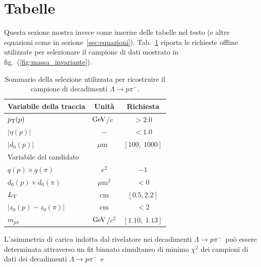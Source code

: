 \documentclass[a4paper,10pt]{article}
\newcommand{\proton}{\ensuremath{p}}
\newcommand{\lambdazero}{\ensuremath{\Lambda}}
\newcommand{\lambdazeroppi}{\ensuremath{\lambdazero \to \proton\pi^-}}
\newcommand{\pt}{\ensuremath{p_{\rm{T}}}}
\newcommand{\lxy}{\ensuremath{L_{\rm{T}}}}
\newcommand{\mum}{\mbox{$\mu$m}}				%
\newcommand{\gev}{\ensuremath{\mathrm{Ge\kern -0.1em V}}}	%
\newcommand{\massgev}{\mbox{\gev/$c^2$}}			%
\newcommand{\pgev}{\mbox{\gev/$c$}}				%
\begin{document}


\section{Tabelle}
\label{sec:tabelle}

Questa sezione mostra invece come inserire delle tabelle nel testo (e altre equazioni come in sezione~\ref{sec:equazioni}). 
Tab.~\ref{tab:selezione} riporta le richieste offline utilizzate per selezionare 
il campione di dati mostrato in fig.~(\ref{fig:massa_invariante}).
\begin{table}[!ht]
\centering
\begin{tabular}{lcc}
\hline\hline
Variabile della traccia		        &	Unit\`a		&	Richiesta		\\
\hline						                                                
$\pt(p)$ 						&	\pgev\		&	$>2.0$			\\
$|\eta(p)|$					&	$-$                  &	$<1.0$			\\
$|d_0(p)|$ 				        &    \mum\		&	$[100,~1000]$		\\
\hline
Variabile del candidato      		&         			&			           	\\
\hline
$q(p)\times q(\pi)$				&	$e^2$		&	$-1$			\\
$d_0(p) \times d_0(\pi)$			&	$\mum^2$	&	$< 0$			\\
\lxy\ 						&	 cm		        &	$[0.5,2.2]$		\\
$|z_{0}(p)-z_{0}(\pi)|$	 		&	 cm		        &	$<2$			\\
$m_{p\pi}$						&	\massgev	&	$[1.10,~1.13]$		\\
\hline\hline
\end{tabular}
\caption[Off-line selection for $\Lambda^0\to p\pi^-$]{Sommario della selezione utilizzata per ricostruire 
il campione di decadimenti \lambdazeroppi.
}  
\label{tab:selezione}
\end{table} 
%
%
L'asimmetria di carica indotta dal rivelatore nei decadimenti \lambdazeroppi\  pu\`o essere determinata 
attraverso un fit binnato simultaneo  di minimo  $\chi^2$  dei campioni di dati dei decadimenti \lambdazeroppi\ e
\end{document}
